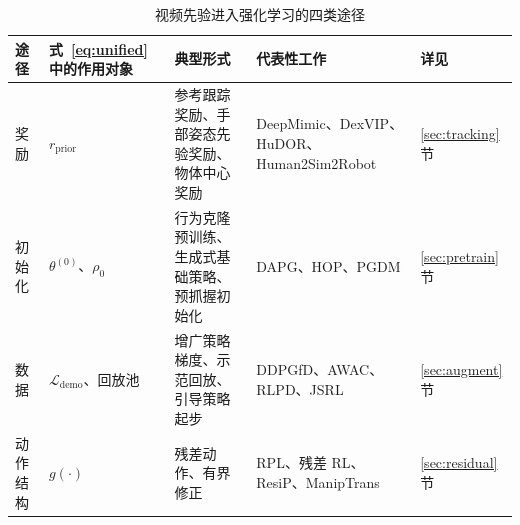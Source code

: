 \documentclass[UTF8,a4paper,zihao=-4]{ctexart}
\begin{document}
\begin{table}[htbp]
  \centering\small
  \caption{视频先验进入强化学习的四类途径}\label{tab:routes}
  \begin{tabularx}{\textwidth}{@{}l l Y Y l@{}}
    \toprule
    途径 & 式~\eqref{eq:unified} 中的作用对象 & 典型形式 & 代表性工作 & 详见 \\
    \midrule
    奖励 & $r_{\mathrm{prior}}$ & 参考跟踪奖励、手部姿态先验奖励、物体中心奖励 & DeepMimic\cite{deepmimic}、DexVIP\cite{dexvip}、HuDOR\cite{hudor}、Human2Sim\-2Robot\cite{human2sim2robot} & \ref{sec:tracking} 节 \\
    初始化 & $\theta^{(0)}$、$\rho_0$ & 行为克隆预训练、生成式基础策略、预抓握初始化 & DAPG\cite{dapg}、HOP\cite{hop}、PGDM\cite{pgdm} & \ref{sec:pretrain} 节 \\
    数据 & $\mathcal{L}_{\mathrm{demo}}$、回放池 & 增广策略梯度、示范回放、引导策略起步 & DDPGfD\cite{ddpgfd}、AWAC\cite{awac}、RLPD\cite{rlpd}、JSRL\cite{jsrl} & \ref{sec:augment} 节 \\
    动作结构 & $g(\cdot)$ & 残差动作、有界修正 & RPL\cite{rpl}、残差 RL\cite{johannink}、ResiP\cite{resip}、ManipTrans\cite{maniptrans} & \ref{sec:residual} 节 \\
    \bottomrule
  \end{tabularx}
\end{table}
\end{document}

